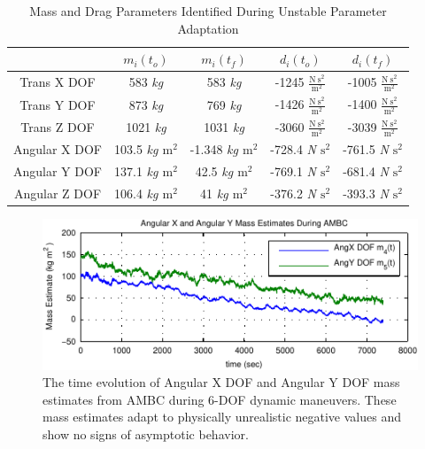 \begin{table}[htbp]
\ssp
\caption{Mass and Drag Parameters Identified During Unstable Parameter Adaptation}
\begin{center}
\begin{tabular}{c|cccc}
 & $m_i(t_o)$ & $m_i(t_f)$ & $d_i(t_o)$ & $d_i(t_f)$ \\ \hline
Trans X \ac{DOF} & 583 {\it kg} & 583 {\it kg}& -1245 {\it $\frac{\text{N}~\text{s}^2}{\text{m}^2}$}& -1005 {\it $\frac{\text{N}~\text{s}^2}{\text{m}^2}$}\\
Trans Y \ac{DOF} & 873 {\it kg} & 769 {\it kg}& -1426 {\it $\frac{\text{N}~\text{s}^2}{\text{m}^2}$}& -1400 {\it $\frac{\text{N}~\text{s}^2}{\text{m}^2}$}\\
Trans Z \ac{DOF} & 1021 {\it kg} & 1031 {\it kg}& -3060 {\it $\frac{\text{N}~\text{s}^2}{\text{m}^2}$}& -3039 {\it $\frac{\text{N}~\text{s}^2}{\text{m}^2}$}\\
Angular X \ac{DOF} & 103.5 {\it kg $\text{m}^2$} & -1.348 {\it kg $\text{m}^2$} & -728.4 {\it N $\text{s}^2$}& -761.5  {\it N $\text{s}^2$}\\
Angular Y \ac{DOF} & 137.1 {\it kg $\text{m}^2$} & 42.5 {\it kg $\text{m}^2$} & -769.1  {\it N $\text{s}^2$}& -681.4  {\it N $\text{s}^2$}\\
Angular Z \ac{DOF} & 106.4 {\it kg $\text{m}^2$} & 41 {\it kg $\text{m}^2$} & -376.2  {\it N $\text{s}^2$}& -393.3  {\it N $\text{s}^2$}\\
\end{tabular}
\end{center}
\label{chUV_AMBC.tb.startCloseDyn}
\vspace*{-5mm}
\end{table}


\begin{center}
\begin{figure}[htbp]
  \begin{center}
    \includegraphics[width=150mm]{./chUV_AMBC/images/m4_m5_Full_Param_EstSm}
  \end{center}
  \caption{ The time evolution of Angular X \ac{DOF} and Angular Y
    \ac{DOF} mass estimates from \ac{AMBC} during 6-\ac{DOF} dynamic
    maneuvers. These mass estimates adapt to physically unrealistic
    negative values and show no signs of asymptotic behavior.}
  \label{chUV_AMBC.fig.m4_m5_Full_Param_Est}
\vspace*{-5mm}
\end{figure}
\end{center}
